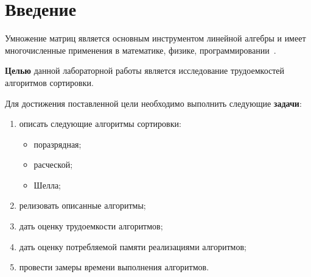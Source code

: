 \chapter*{Введение}

Умножение матриц является основным инструментом линейной алгебры и имеет многочисленные применения в математике, физике, программировании~\cite{vinograd-haskell}. 

\textbf{Целью} данной лабораторной работы является исследование трудоемкостей алгоритмов сортировки.

Для достижения поставленной цели необходимо выполнить следующие \textbf{задачи}:
\begin{enumerate}[label={\arabic*)}]
    \item описать следующие алгоритмы сортировки:
        \begin{itemize}
            \item поразрядная;
            \item расческой;
            \item Шелла;
        \end{itemize}
    \item релизовать описанные алгоритмы;
    \item дать оценку трудоемкости алгоритмов;
    \item дать оценку потребляемой памяти реализациями алгоритмов;
    \item провести замеры времени выполнения алгоритмов.
\end{enumerate}

